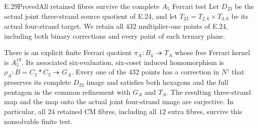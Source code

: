 \begin{statement}{E.29}{Proved}{All retained fibres survive the complete $A_5$ Ferrari test}
Let $D_{23}$ be the actual joint three-strand source quotient of
E.24, and let $T_{23}=T_{2,6}\times T_{3,6}$ be its actual
four-strand target. We retain all $432$ multiplier-one points
of E.24, including both binary corrections and every point
of each ternary plane.

There is an explicit finite Ferrari quotient
$\pi_A:B_4\twoheadrightarrow T_A$ whose free Ferrari kernel is
$A_5^{19}$. Its associated six-evaluation, six-coset induced
homomorphism is $\rho_A:B=C_2*C_3\twoheadrightarrow G_A$.
Every one of the $432$ points has a correction in $N'$ that
preserves its complete $D_{23}$ image and satisfies both
hexagons and the full pentagon in the common refinement with
$G_A$ and $T_A$. The resulting three-strand map and the map
onto the actual joint four-strand image are surjective.
In particular, all $24$ retained CM fibres, including all
$12$ extra fibres, survive this nonsolvable finite test.
\end{statement}
